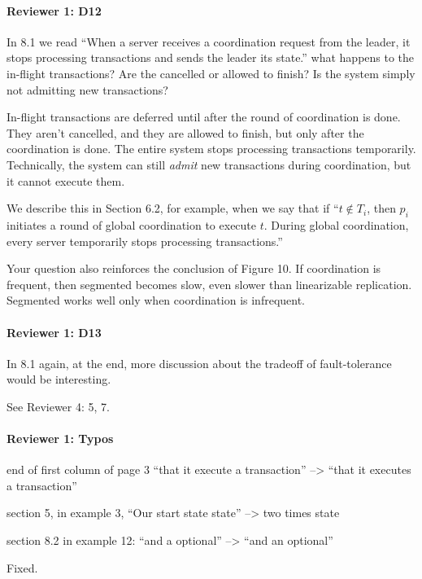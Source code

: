 \documentclass[9pt]{article}
\begin{document}
\begin{multicols*}{2}
\paragraph{Reviewer 1: D12}
\begin{feedback}
  In 8.1 we read ``When a server receives a coordination request from the
  leader, it stops processing transactions and sends the leader its state.''
  what happens to the in-flight transactions? Are the cancelled or allowed to
  finish? Is the system simply not admitting new transactions?
\end{feedback}
In-flight transactions are deferred until after the round of coordination is
done. They aren't cancelled, and they are allowed to finish, but only after the
coordination is done. The entire system stops processing transactions
temporarily.  Technically, the system can still \emph{admit} new transactions
during coordination, but it cannot execute them.

We describe this in Section 6.2, for example, when we say that if ``$t \notin
T_i$, then $p_i$ initiates a round of global coordination to execute $t$.
During global coordination, every server temporarily stops processing
transactions.''

Your question also reinforces the conclusion of Figure 10. If coordination is
frequent, then segmented \invariantconfluence{} becomes slow, even slower than
linearizable replication. Segmented \invariantconfluent{} works well only when
coordination is infrequent.

\paragraph{Reviewer 1: D13}
\begin{feedback}
  In 8.1 again, at the end, more discussion about the tradeoff of
  fault-tolerance would be interesting.
\end{feedback}
See Reviewer 4: 5, 7.

\paragraph{Reviewer 1: Typos}
\begin{feedback}
  end of first column of page 3 ``that it execute a transaction'' --> ``that it
  executes a transaction''

  section 5, in example 3, ``Our start state state'' --> two times state

  section 8.2 in example 12: ``and a optional'' --> ``and an optional''
\end{feedback}
Fixed.


\end{multicols*}
\end{document}
